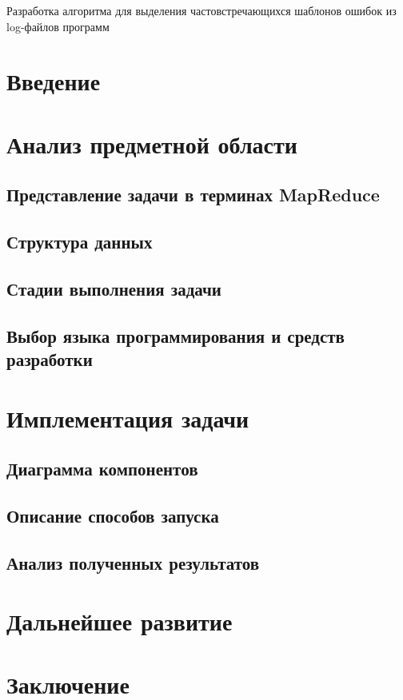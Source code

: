 \documentclass[a4paper,12pt]{report}
\theoremstyle{plain}
\theoremstyle{definition}
\theoremstyle{remark}
\begin{document}



  Разработка алгоритма для выделения частовстречающихся шаблонов ошибок из log-файлов программ
  \tableofcontents

  \chapter*{Введение}
  
  \chapter{Анализ предметной области}
  \section{Представление задачи в терминах MapReduce}
  \section{Структура данных}
  \section{Стадии выполнения задачи}
  \section{Выбор языка программирования и средств разработки}

  \chapter{Имплементация задачи}
  \section{Диаграмма компонентов}
  \section{Описание способов запуска}
  \section{Анализ полученных результатов}

  \chapter{Дальнейшее развитие}



  \chapter*{Заключение}

\end{document}
